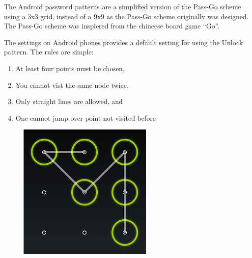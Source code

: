    The Android password patterns are a simplified version of the Pass-Go scheme using a 3x3 grid, instead of a 9x9 as the Pass-Go scheme originally was designed. The Pass-Go scheme was inspiered from the chineese board game ``Go''.

    The settings on Android phones provides a default setting for using the Unlock pattern. 
    The rules are simple: 
        \begin{enumerate}
            \item At least four points must be chosen,
            \item You cannot vist the same node twice.
            \item Only straight lines are allowed, and
            \item One cannot jump over point not visited before
        \end{enumerate}

    \begin{figure}[H]
        \centering
        \includegraphics[scale=0.8]{pics/patternLock.png}
    \end{figure}